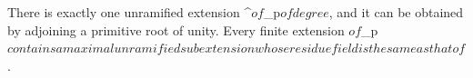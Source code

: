 There is exactly one unramified extension ^{}$ of $_p$ of degree $, and it can be obtained by adjoining a primitive  root of unity. Every finite extension $ of $_p$ contains a maximal unramified subextension whose residue field is the same as that of $.
